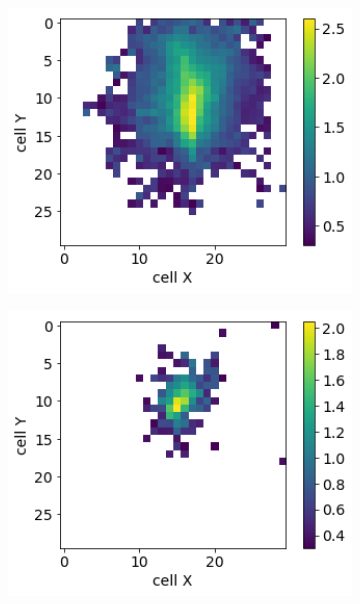 \documentclass{PoS}
\begin{document}
\begin{figure}
\captionsetup[subfigure]{justification=centering}
  \centering
  \begin{subfigure}{0.24\textwidth}
    \centering
    \includegraphics[width=1\textwidth]{figures/1_real.png}
  \end{subfigure}
  \begin{subfigure}{0.24\textwidth}
    \centering
    \includegraphics[width=1\textwidth]{figures/2_real.png}
  \end{subfigure}
    \begin{subfigure}{0.24\textwidth}

\end{subfigure}
\end{figure}
\end{document}
